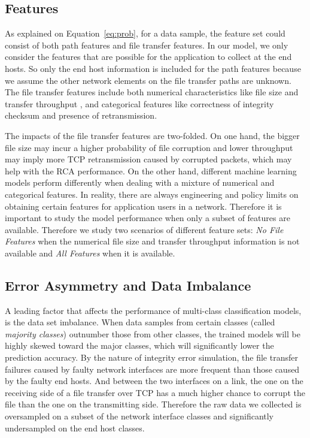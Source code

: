 \subsection{Features}
As explained on Equation~\ref{eq:prob}, for a data sample, the feature set could consist of both path features and file transfer features. In our model, we only consider the features that are possible for the application to collect at the end hosts.
So only the end host information is included for the path features because we assume the other network elements on the file transfer paths are unknown. 
The file transfer features include both numerical characteristics like file size and transfer throughput , and categorical features like correctness of integrity checksum and presence of retransmission. 

The impacts of the file transfer features are two-folded. On one hand, the bigger file size may incur a higher probability of file corruption and lower throughput may imply more TCP retransmission caused by corrupted packets, which may help with the RCA performance. On the other hand, different machine learning models perform differently when dealing with a mixture of numerical and categorical features. In reality, there are always engineering and policy limits on obtaining certain 
features for application users in a network. Therefore it is important to study the model performance when only a subset of features are available. Therefore we study two scenarios of different feature sets: {\it No File Features} when the numerical file size and transfer throughput information is not available and {\it All Features} when it is available.

\subsection{Error Asymmetry and Data Imbalance} 
\label{sub:ml:imbalance}
A leading factor that affects the performance of multi-class classification models, is the data set imbalance. When data samples from certain classes (called {\it majority classes}) outnumber those from other classes, the trained models will be highly skewed toward the major classes, which will significantly lower the prediction accuracy. By the nature of integrity error simulation, the file transfer failures caused by faulty network interfaces are more frequent than those caused by the faulty end hosts. And between the two interfaces on a link, the one on the receiving side of a file transfer over TCP has a much higher chance to corrupt the file than the one on the transmitting side. Therefore the raw data we collected is oversampled on a subset of the network interface classes and significantly undersampled on the end host classes. 